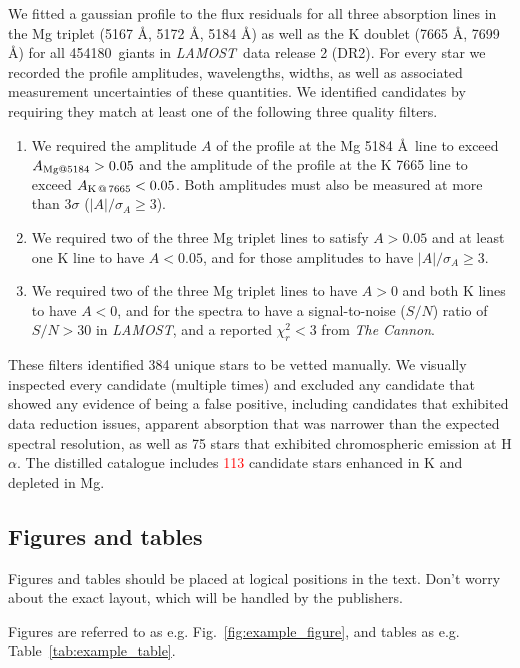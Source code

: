 \documentclass[a4paper,fleqn,usenatbib]{mnras}
\newcommand{\todo}[1]{\textcolor{red}{#1}}
\newcommand{\LamostGiants}{454180}
\newcommand{\project}[1]{\emph{#1}}
\newcommand{\lamost}{\project{LAMOST}}
\newcommand{\tc}{\project{The Cannon}}
\begin{document}
We fitted a gaussian profile to the flux residuals for all three absorption lines in the Mg triplet (5167 \AA, 5172 \AA, 5184 \AA) as well as the K doublet (7665 \AA, 7699 \AA) for all \LamostGiants\ giants in \lamost\ data release 2 (DR2). For every star we recorded the profile amplitudes, wavelengths, widths, as well as associated measurement uncertainties of these quantities. We identified candidates by requiring they match at least one of the following three quality filters.
\begin{enumerate}
\item We required the amplitude $A$ of the profile at the Mg 5184 \AA \ line to exceed $A_{{\rm Mg} @ 5184} > 0.05$ and the amplitude of the profile at the K 7665 line to exceed $A_{{\rm K}\,@\,7665} < 0.05$. Both amplitudes must also be measured at more than $3\sigma$ ($|A|/\sigma_{A} \geq 3$).
\item We required two of the three Mg triplet lines to satisfy $A > 0.05$ and at least one K line to have $A < 0.05$, and for those amplitudes to have $|A|/\sigma_{A} \geq 3$.
\item We required two of the three Mg triplet lines to have $A > 0$ and both K lines to have $A < 0$, and for the spectra to have a signal-to-noise ($S/N$) ratio of $S/N > 30$ in \lamost, and a reported $\chi_{r}^2 < 3$ from \tc.
\end{enumerate} 
 
These filters identified 384 unique stars to be vetted manually. We visually inspected every candidate (multiple times) and excluded any candidate that showed any evidence of being a false positive, including candidates that exhibited data reduction issues, apparent absorption that was narrower than the expected spectral resolution, as well as 75 stars that exhibited chromospheric emission at H$\alpha$. The distilled catalogue includes \todo{113} candidate stars enhanced in K and depleted in Mg.


\subsection{Figures and tables}

Figures and tables should be placed at logical positions in the text. Don't
worry about the exact layout, which will be handled by the publishers.

Figures are referred to as e.g. Fig.~\ref{fig:example_figure}, and tables as
e.g. Table~\ref{tab:example_table}.
\end{document}
